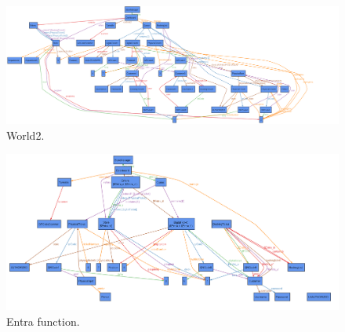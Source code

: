 \begin{figure}
	\centering
	\includegraphics[width=1.0\textwidth]{images/world_3.png}
	\caption{World2.}
	\label{figure: World2}
\end{figure}

\begin{figure}
	\centering
	\includegraphics[width=1.0\textwidth]{images/EntraFunction}
	\caption{Entra function.}
	\label{figure: Entra function}
\end{figure}